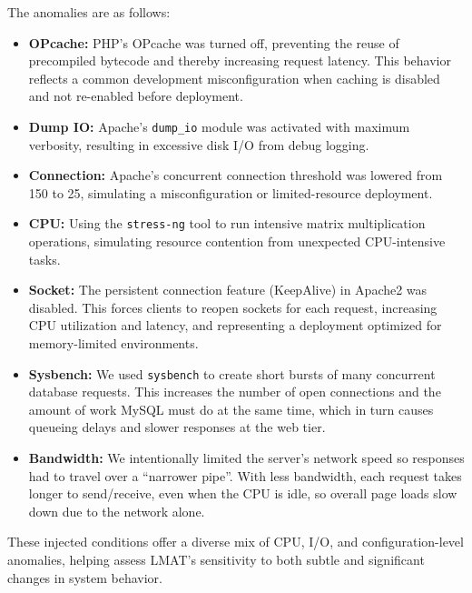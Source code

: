 \documentclass[preprint,12pt]{elsarticle}
\begin{document}
The anomalies are as follows:

\begin{itemize}
    \item \textbf{OPcache:} PHP's OPcache was turned off, preventing the reuse of precompiled bytecode and thereby increasing request latency. This behavior reflects a common development misconfiguration when caching is disabled and not re-enabled before deployment.
    \item \textbf{Dump IO:} Apache’s \texttt{dump\_io} module was activated with maximum verbosity, resulting in excessive disk I/O from debug logging.
    \item \textbf{Connection:} Apache’s concurrent connection threshold was lowered from 150 to 25, simulating a misconfiguration or limited-resource deployment.
    \item \textbf{CPU:} Using the \texttt{stress-ng} tool to run intensive matrix multiplication operations, simulating resource contention from unexpected CPU-intensive tasks.
    \item \textbf{Socket:} The persistent connection feature (KeepAlive) in Apache2 was disabled. This forces clients to reopen sockets for each request, increasing CPU utilization and latency, and representing a deployment optimized for memory-limited environments.
    \item \textbf{Sysbench:} We used \texttt{sysbench} to create short bursts of many concurrent database requests. This increases the number of open connections and the amount of work MySQL must do at the same time, which in turn causes queueing delays and slower responses at the web tier.
    \item \textbf{Bandwidth:} We intentionally limited the server’s network speed so responses had to travel over a “narrower pipe”. With less bandwidth, each request takes longer to send/receive, even when the CPU is idle, so overall page loads slow down due to the network alone.
\end{itemize}

These injected conditions offer a diverse mix of CPU, I/O, and configuration-level anomalies, helping assess LMAT’s sensitivity to both subtle and significant changes in system behavior.
\end{document}
